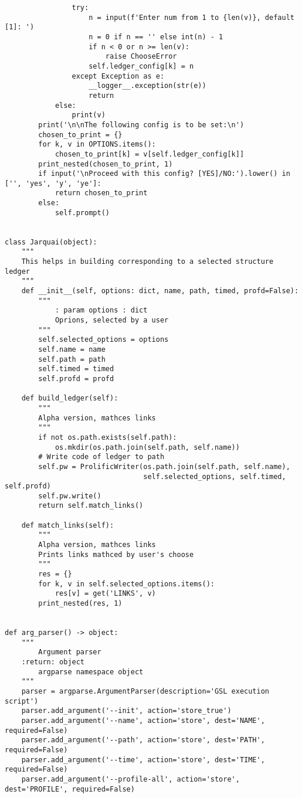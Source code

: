 \begin{lstlisting}
                try:
                    n = input(f'Enter num from 1 to {len(v)}, default [1]: ')
                    n = 0 if n == '' else int(n) - 1
                    if n < 0 or n >= len(v):
                        raise ChooseError
                    self.ledger_config[k] = n
                except Exception as e:
                    __logger__.exception(str(e))
                    return
            else:
                print(v)
        print('\n\nThe following config is to be set:\n')
        chosen_to_print = {}
        for k, v in OPTIONS.items():
            chosen_to_print[k] = v[self.ledger_config[k]]
        print_nested(chosen_to_print, 1)
        if input('\nProceed with this config? [YES]/NO:').lower() in ['', 'yes', 'y', 'ye']:
            return chosen_to_print
        else:
            self.prompt()


class Jarquai(object):
    """
    This helps in building corresponding to a selected structure ledger
    """
    def __init__(self, options: dict, name, path, timed, profd=False):
        """
            : param options : dict
            Oprions, selected by a user
        """
        self.selected_options = options
        self.name = name
        self.path = path
        self.timed = timed
        self.profd = profd

    def build_ledger(self):
        """
        Alpha version, mathces links
        """
        if not os.path.exists(self.path):
            os.mkdir(os.path.join(self.path, self.name))
        # Write code of ledger to path
        self.pw = ProlificWriter(os.path.join(self.path, self.name),
                                 self.selected_options, self.timed, self.profd)
        self.pw.write()
        return self.match_links()

    def match_links(self):
        """
        Alpha version, mathces links
        Prints links mathced by user's choose
        """
        res = {}
        for k, v in self.selected_options.items():
            res[v] = get('LINKS', v)
        print_nested(res, 1)


def arg_parser() -> object:
    """
        Argument parser
    :return: object
        argparse namespace object
    """
    parser = argparse.ArgumentParser(description='GSL execution script')
    parser.add_argument('--init', action='store_true')
    parser.add_argument('--name', action='store', dest='NAME', required=False)
    parser.add_argument('--path', action='store', dest='PATH', required=False)
    parser.add_argument('--time', action='store', dest='TIME', required=False)
    parser.add_argument('--profile-all', action='store', dest='PROFILE', required=False)


\end{lstlisting}
